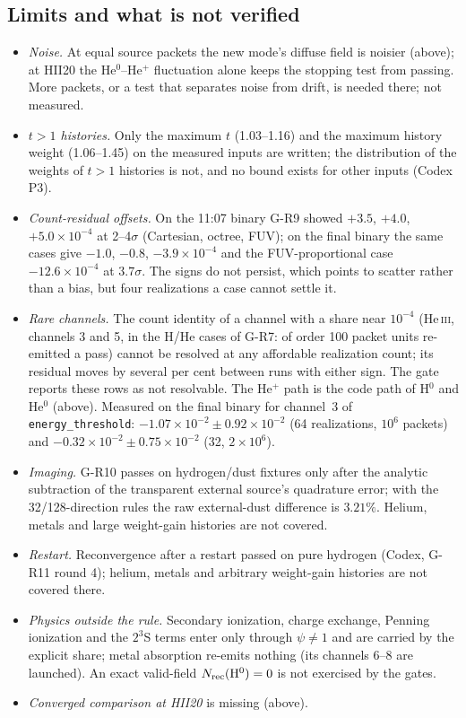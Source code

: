 \documentclass[english,a4paper]{my_memo}
\newcommand{\code}[1]{\texttt{#1}}
\begin{document}
\subsection{Limits and what is not verified}
\label{sec:reem-limits}
\begin{itemize}\itemsep1pt
\item \emph{Noise.}  At equal source packets the new mode's diffuse field is
  noisier (above); at HII20 the He$^0$--He$^+$ fluctuation alone keeps the
  stopping test from passing.  More packets, or a test that separates noise
  from drift, is needed there; not measured.
\item \emph{$t>1$ histories.}  Only the maximum $t$ (1.03--1.16) and the
  maximum history weight (1.06--1.45) on the measured inputs are written;
  the distribution of the weights of $t>1$ histories is not, and no bound
  exists for other inputs (Codex P3).
\item \emph{Count-residual offsets.}  On the 11:07 binary G-R9 showed
  $+3.5$, $+4.0$, $+5.0\times10^{-4}$ at 2--4$\sigma$ (Cartesian, octree,
  FUV); on the final binary the same cases give $-1.0$, $-0.8$, $-3.9\times10^{-4}$
  and the FUV-proportional case $-12.6\times10^{-4}$ at $3.7\sigma$.  The
  signs do not persist, which points to scatter rather than a bias, but
  four realizations a case cannot settle it.
\item \emph{Rare channels.}  The count identity of a channel with a share
  near $10^{-4}$ (He\,\textsc{iii}, channels 3 and 5, in the H/He cases of
  G-R7: of order 100 packet units re-emitted a pass) cannot be resolved at
  any affordable realization count; its residual moves by several per cent
  between runs with either sign.  The gate reports these rows as not
  resolvable.  The He$^+$ path is the code path of H$^0$ and He$^0$
  (above).  Measured on the final binary for channel~3 of
  \code{energy\_threshold}: $-1.07\times10^{-2}\pm0.92\times10^{-2}$ (64
  realizations, $10^6$ packets) and $-0.32\times10^{-2}\pm0.75\times10^{-2}$
  (32, $2\times10^6$).
\item \emph{Imaging.}  G-R10 passes on hydrogen/dust fixtures only after
  the analytic subtraction of the transparent external source's quadrature
  error; with the 32/128-direction rules the raw external-dust difference is
  $3.21\%$.  Helium, metals and large weight-gain histories are not covered.
\item \emph{Restart.}  Reconvergence after a restart passed on pure hydrogen
  (Codex, G-R11 round 4); helium, metals and arbitrary weight-gain histories
  are not covered there.
\item \emph{Physics outside the rule.}  Secondary ionization, charge
  exchange, Penning ionization and the $2^3$S terms enter only through
  $\psi\ne1$ and are carried by the explicit share; metal absorption
  re-emits nothing (its channels 6--8 are launched).  An exact
  valid-field $N_{\rm rec}({\rm H^0})=0$ is not exercised by the gates.
\item \emph{Converged comparison at HII20} is missing (above).
\end{itemize}
\end{document}
